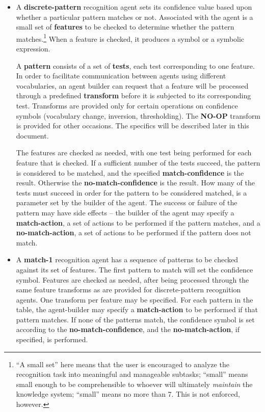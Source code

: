 \begin{itemize}
\item
{}
A {\bf discrete-pattern} recognition agent sets its confidence value
based upon whether a particular pattern matches or not.  Associated
with the agent is a small set of {\bf features} to be checked to
determine whether the pattern matches.\footnote{``A small set'' here
means that the user is encouraged to analyze the recognition task into
meaningful and manageable subtasks; ``small'' means small enough to be
comprehensible to whoever will ultimately {\em maintain\/} the
knowledge system; ``small'' means no more than 7.  This is not
enforced, however.} When a feature is checked, it produces a symbol or
a symbolic expression. 

A {\bf pattern} consists of a set of {\bf tests}, each test
corresponding to one feature.  In order to facilitate communication
between agents using different vocabularies, an agent builder can
request that a feature will be processed through a predefined {\bf
transform} before it is subjected to its corresponding test.
Transforms are provided only for certain operations on confidence
symbols (vocabulary change, inversion, thresholding). The {\bf NO-OP}
transform is provided for other occasions.  The specifics will be
described later in this document.  

The features are checked as needed, with one test being performed for
each feature that is checked.  If a sufficient number of the tests
succeed, the pattern is considered to be matched, and the specified
{\bf match-confidence} is the result.  Otherwise the {\bf
no-match-confidence} is the result.  How many of the tests must
succeed in order for the pattern to be considered matched, is a
parameter set by the builder of the agent. The success or failure of
the pattern may have side effects -- the builder of the agent may
specify a {\bf match-action}, a set of actions to be performed if the
pattern matches, and a {\bf no-match-action}, a set of actions to be
performed if the pattern does not match.


\item
{}
A {\bf match-1} recognition agent has a sequence of patterns to be
checked against its set of features.  The first pattern to match will
set the confidence symbol.  Features are checked as needed, after
being processed through the same feature transforms as are provided
for discrete-pattern recognition agents.  One transform per feature
may be specified. For each pattern in the table, the agent-builder may
specify a {\bf match-action} to be performed if that pattern matches.
If none of the patterns match, the confidence symbol is set according
to the {\bf no-match-confidence}, and the {\bf no-match-action}, if
specified, is performed.


\end{itemize}

